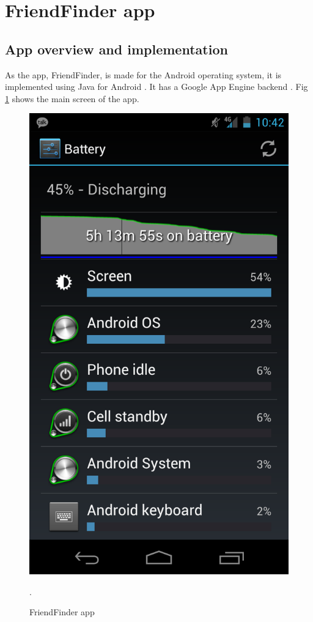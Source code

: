 \section{FriendFinder app}

\subsection{App overview and implementation}

As the app, FriendFinder, is made for the Android operating system, it is implemented using Java for Android \cite{jandroid}. It has a Google App Engine backend \cite{googleapp}. Fig \ref{pic:ff_prtscr} shows the main screen of the app. 

\begin{figure}[h]
	\begin{center}
		\includegraphics[scale=0.2]{figures/galaxy-nexus-battery.png}
	\end{center}
	
	\caption{FriendFinder app}.
	\label{pic:ff_prtscr}

\end{figure} 

